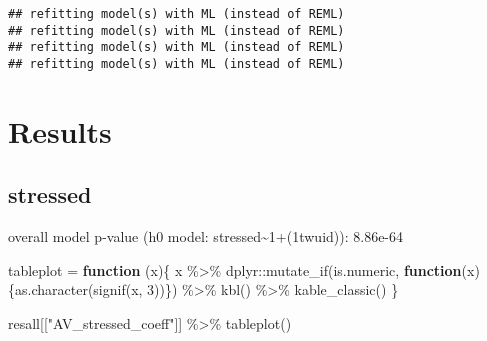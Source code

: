 \documentclass[
]{article}
\newenvironment{Shaded}{\begin{snugshade}}{\end{snugshade}}
\newcommand{\ControlFlowTok}[1]{\textcolor[rgb]{0.13,0.29,0.53}{\textbf{#1}}}
\newcommand{\DecValTok}[1]{\textcolor[rgb]{0.00,0.00,0.81}{#1}}
\newcommand{\FunctionTok}[1]{\textcolor[rgb]{0.00,0.00,0.00}{#1}}
\newcommand{\NormalTok}[1]{#1}
\newcommand{\OtherTok}[1]{\textcolor[rgb]{0.56,0.35,0.01}{#1}}
\newcommand{\SpecialCharTok}[1]{\textcolor[rgb]{0.00,0.00,0.00}{#1}}
\newcommand{\StringTok}[1]{\textcolor[rgb]{0.31,0.60,0.02}{#1}}
\begin{document}
\begin{verbatim}
## refitting model(s) with ML (instead of REML)
## refitting model(s) with ML (instead of REML)
## refitting model(s) with ML (instead of REML)
## refitting model(s) with ML (instead of REML)
\end{verbatim}

\hypertarget{results}{%
\section{Results}\label{results}}

\hypertarget{stressed}{%
\subsection{stressed}\label{stressed}}

overall model p-value (h0 model:
stressed\textasciitilde1+(1\textbar twuid)): 8.86e-64

\begin{Shaded}
\begin{Highlighting}[]
\NormalTok{tableplot }\OtherTok{=} \ControlFlowTok{function}\NormalTok{ (x)\{}
\NormalTok{  x }\SpecialCharTok{\%\textgreater{}\%}\NormalTok{ dplyr}\SpecialCharTok{::}\FunctionTok{mutate\_if}\NormalTok{(is.numeric, }\ControlFlowTok{function}\NormalTok{(x)\{}\FunctionTok{as.character}\NormalTok{(}\FunctionTok{signif}\NormalTok{(x, }\DecValTok{3}\NormalTok{))\}) }\SpecialCharTok{\%\textgreater{}\%} \FunctionTok{kbl}\NormalTok{() }\SpecialCharTok{\%\textgreater{}\%} \FunctionTok{kable\_classic}\NormalTok{()}
\NormalTok{  \}}

\NormalTok{resall[[}\StringTok{"AV\_stressed\_coeff"}\NormalTok{]] }\SpecialCharTok{\%\textgreater{}\%} \FunctionTok{tableplot}\NormalTok{()}
\end{Highlighting}
\end{Shaded}
\end{document}
